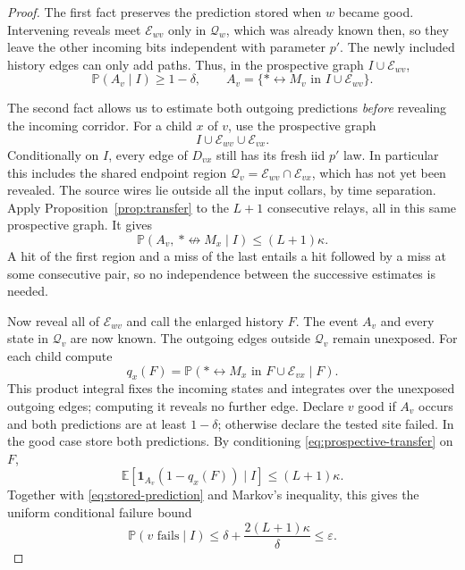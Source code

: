\documentclass[11pt]{article}
\theoremstyle{definition}
\newcommand{\PP}{\mathbb P}
\newcommand{\EE}{\mathbb E}
\begin{document}
\begin{proof}
The first fact preserves the prediction stored when $w$ became good.
Intervening reveals meet $\mathcal E_{wv}$ only in $\mathcal Q_w$,
which was already known then, so they leave the other incoming bits
independent with parameter $p'$. The newly included history edges can
only add paths. Thus, in the prospective graph $I\cup\mathcal E_{wv}$,
\begin{equation}\label{eq:stored-prediction}
 \PP(A_v\mid I)\ge1-\delta,
 \qquad A_v=\{*\leftrightarrow M_v\text{ in }I\cup\mathcal E_{wv}\}.
\end{equation}

The second fact allows us to estimate both outgoing predictions
\emph{before} revealing the incoming corridor. For a child $x$ of $v$,
use the prospective graph
\[
 I\cup\mathcal E_{wv}\cup\mathcal E_{vx}.
\]
Conditionally on $I$, every edge of $D_{vx}$ still has its fresh iid
$p'$ law. In particular this includes the shared endpoint region
$\mathcal Q_v=\mathcal E_{wv}\cap\mathcal E_{vx}$, which has not yet
been revealed. The source wires lie outside all the input collars,
by time separation. Apply Proposition~\ref{prop:transfer} to the
$L+1$ consecutive relays, all in this same prospective graph. It gives
\begin{equation}\label{eq:prospective-transfer}
 \PP(A_v,\ *\nleftrightarrow M_x\mid I)\le(L+1)\kappa.
\end{equation}
A hit of the first region and a miss of the last entails a hit
followed by a miss at some consecutive pair, so no independence
between the successive estimates is needed.

Now reveal all of $\mathcal E_{wv}$ and call the enlarged history
$F$. The event $A_v$ and every state in $\mathcal Q_v$ are now known.
The outgoing edges outside $\mathcal Q_v$ remain unexposed. For each
child compute
\[
 q_x(F)=\PP(*\leftrightarrow M_x\text{ in }F\cup\mathcal E_{vx}\mid F).
\]
This product integral fixes the incoming states and integrates over
the unexposed outgoing edges; computing it reveals no further edge.
Declare $v$ good if $A_v$ occurs and both predictions are at least
$1-\delta$; otherwise declare the tested site failed. In the good
case store both predictions. By conditioning
\eqref{eq:prospective-transfer} on $F$,
\[
 \EE[\mathbf1_{A_v}(1-q_x(F))\mid I]\le(L+1)\kappa.
\]
Together with \eqref{eq:stored-prediction} and Markov's inequality,
this gives the uniform conditional failure bound
\begin{equation}\label{eq:conditional-test-failure}
 \PP(v\text{ fails}\mid I)
 \le\delta+\frac{2(L+1)\kappa}{\delta}
 \le\varepsilon.
\end{equation}


\end{proof}
\end{document}
